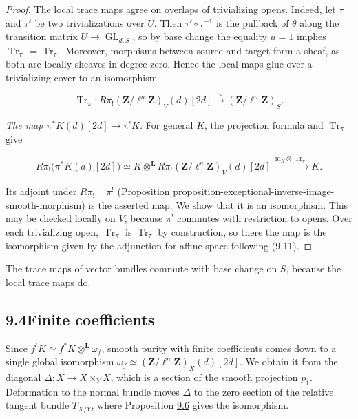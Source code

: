 \documentclass[11pt]{article}
\providecommand{\GL}{}\renewcommand{\GL}{\operatorname{GL}}
\begin{document}
\begin{proof}[{Proof}]
The local trace maps agree on overlaps of trivializing opens. Indeed, let \(\tau\) and \(\tau'\) be two trivializations over \(U\). Then \(\tau'\circ\tau^{-1}\) is the pullback of \(\theta\) along the transition matrix \(U\to\GL_{d,S}\), so by base change the equality \(u=1\) implies \(\operatorname{Tr}_{\tau'}=\operatorname{Tr}_{\tau}\). Moreover, morphisms between source and target form a sheaf, as both are locally sheaves in degree zero. Hence the local maps glue over a trivializing cover to an isomorphism

\[
\operatorname{Tr}_{\pi}:
R\pi_!(\mathbf Z/\ell^n\mathbf Z)_V(d)[2d]
\xrightarrow{\sim}(\mathbf Z/\ell^n\mathbf Z)_S.
\]

\emph{The map \(\pi^*K(d)[2d]\to\pi^!K\).} For general \(K\), the projection formula and \(\operatorname{Tr}_\pi\) give

\[
R\pi_!\bigl(\pi^{*}K(d)[2d]\bigr)
\simeq K\otimes^{\mathbf L} R\pi_!(\mathbf Z/\ell^n\mathbf Z)_V(d)[2d]
\xrightarrow{\ \mathrm{id}_K\otimes\operatorname{Tr}_{\pi}\ }K.
\]

Its adjoint under \(R\pi_!\dashv\pi^{!}\) (Proposition proposition-exceptional-inverse-image-smooth-morphism) is the asserted map. We show that it is an isomorphism. This may be checked locally on \(V\), because \(\pi^!\) commutes with restriction to opens. Over each trivializing open, \(\operatorname{Tr}_\pi\) is \(\operatorname{Tr}_\tau\) by construction, so there the map is the isomorphism given by the adjunction for affine space following (9.11).
\end{proof}

\label{bp23}%
The trace maps of vector bundles commute with base change on \(S\), because the local trace maps do.


\subsection*{\texorpdfstring{9.4\quad Finite coefficients}{9.4 Finite coefficients}}
\label{bp24}%
\label{bp25}%
Since \(f^!K\simeq f^*K\otimes^{\mathbf L}\omega_f\), smooth purity with finite coefficients comes down to a single global isomorphism \(\omega_f\simeq(\mathbf Z/\ell^n\mathbf Z)_X(d)[2d]\). We obtain it from the diagonal \(\Delta:X\to X\times_YX\), which is a section of the smooth projection \(p_1\). Deformation to the normal bundle moves \(\Delta\) to the zero section of the relative tangent bundle \(T_{X/Y}\), where Proposition \hyperref[bp21]{9.6} gives the isomorphism.
\end{document}
